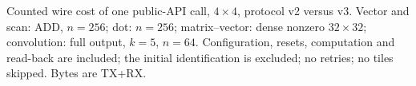 \begin{table}[t]
  \centering
  \caption{Counted wire cost of one public-API call, $4\times4$, protocol v2
  versus v3. Vector and scan: ADD, $n=256$; dot: $n=256$; matrix--vector:
  dense nonzero $32\times32$; convolution: full output, $k=5$, $n=64$.
  Configuration, resets, computation and read-back are included; the initial
  identification is excluded; no retries; no tiles skipped. Bytes are TX+RX.}
  \label{tab:measured}
  \small
  
\end{table}
